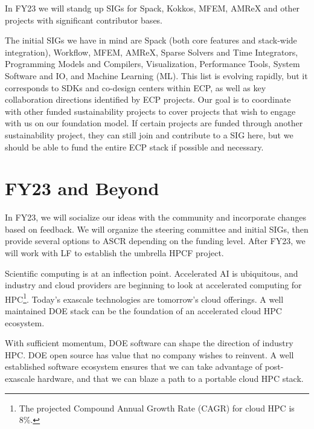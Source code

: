 \documentclass[11pt]{article}
\begin{document}
In FY23 we will standg up SIGs for Spack, Kokkos, MFEM, AMReX and other
projects with significant contributor bases. 

The initial SIGs we have in mind are Spack (both core features and stack-wide
integration), Workflow, MFEM, AMReX, Sparse Solvers and Time Integrators,
Programming Models and Compilers, Visualization, Performance Tools, System Software and
IO, and Machine Learning (ML). This list is evolving rapidly, but it corresponds to SDKs
and co-design centers within ECP, as well as key collaboration directions identified by
ECP projects. Our goal is to coordinate with other funded sustainability projects to
cover projects that wish to engage with us on our foundation model. If certain projects
are funded through another sustainability project, they can still join and contribute to
a SIG here, but we should be able to fund the entire ECP stack if possible and
necessary.

\section{FY23 and Beyond}

In FY23, we will socialize our ideas with the community and incorporate changes based on
feedback. We will organize the steering committee and initial SIGs, then provide several
options to ASCR depending on the funding level. After FY23, we will work with LF to
establish the umbrella HPCF project.

Scientific computing is at an inflection point. Accelerated AI is ubiquitous, and
industry and cloud providers are beginning to look at accelerated computing for
HPC\footnote{The projected Compound Annual Growth Rate (CAGR) for cloud HPC is 8\%.}.
Today's exascale technologies are tomorrow's cloud offerings. A well maintained DOE
stack can be the foundation of an accelerated cloud HPC ecosystem.

With sufficient momentum, DOE software can shape the direction of industry HPC.
DOE open source has value that no company wishes to reinvent. A well established
software ecosystem ensures that we can take advantage of post-exascale hardware, and
that we can blaze a path to a portable cloud HPC stack.




%
%  
\end{document}
